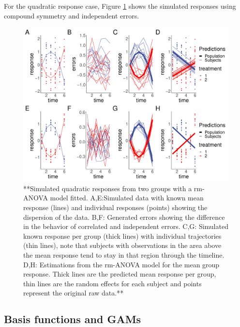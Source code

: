 \documentclass[
]{article}
\begin{document}
For the quadratic response case, Figure \ref{fig:quadratic-cases} shows the simulated responses using compound symmetry and independent errors.

\begin{figure}[!h]
\includegraphics{Full_document_files/figure-latex/quadratic-cases-1} \caption{**Simulated quadratic responses from two groups with a rm-ANOVA model fitted. A,E:Simulated data with known mean response (lines) and individual responses (points) showing the dispersion of the data. B,F: Generated errors showing the difference in the behavior of correlated and independent errors.  C,G: Simulated known response per group (thick lines) with individual trajectories (thin lines), note that subjects with observations in the area above the mean response tend to stay in that region through the timeline. D,H: Estimations from the rm-ANOVA model for the mean group response. Thick lines are the predicted mean response per group, thin lines are the random effects for each subject and points represent the original raw data.**}\label{fig:quadratic-cases}
\end{figure}

\hypertarget{basis-functions-and-gams}{%
\subsection{Basis functions and GAMs}\label{basis-functions-and-gams}}
\end{document}
